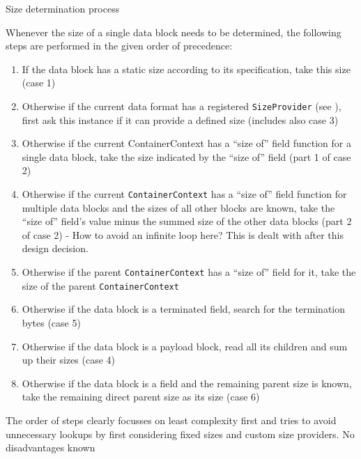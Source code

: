 {%
Size determination process
}
{%
  Whenever the size of a single data block needs to be determined, the following steps are performed in the given order of precedence:
\begin{enumerate}
\item If the data block has a static size according to its specification, take this size (case 1)
\item Otherwise if the current data format has a registered \texttt{SizeProvider} (see ), first ask this instance if it can provide a defined size (includes also case 3)
\item Otherwise if the current ContainerContext has a ``size of'' field function for a single data block, take the size indicated by the ``size of'' field (part 1 of case 2)
\item Otherwise if the current \texttt{ContainerContext} has a ``size of'' field function for multiple data blocks and the sizes of all other blocks are known, take the ``size of'' field's value minus the summed size of the other data blocks (part 2 of case 2) - How to avoid an infinite loop here? This is dealt with after this design decision.
\item Otherwise if the parent \texttt{ContainerContext} has a ``size of'' field for it, take the size of the parent \texttt{ContainerContext}
\item Otherwise if the data block is a terminated field, search for the termination bytes (case 5)
\item Otherwise if the data block is a payload block, read all its children and sum up their sizes (case 4)
\item Otherwise if the data block is a field and the remaining parent size is known, take the remaining direct parent size as its size (case 6)
\end{enumerate}
}
{%
The order of steps clearly focusses on least complexity first and tries to avoid unnecessary lookups by first considering fixed sizes and custom size providers.
}
{%
No disadvantages known
}

